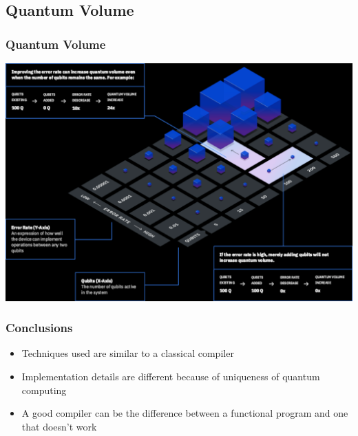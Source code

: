 \documentclass[aspectratio=169,11pt,hyperref={colorlinks=true}]{beamer}
\begin{document}
\subsection{Quantum Volume}
{
\begin{frame}
    \frametitle{Quantum Volume\footnotemark[1]}
    \begin{center}
        \includegraphics[width=\textwidth,height=.8\textheight,keepaspectratio]{qv.png}
    \end{center}
\end{frame}
}

\begin{frame}
    \frametitle{Conclusions}
    \begin{itemize}
        \item Techniques used are similar to a classical compiler
        \item Implementation details are different because of uniqueness of quantum computing
        \item A good compiler can be the difference between a functional
            program and one that doesn't work
    \end{itemize}
\end{frame}
\end{document}
